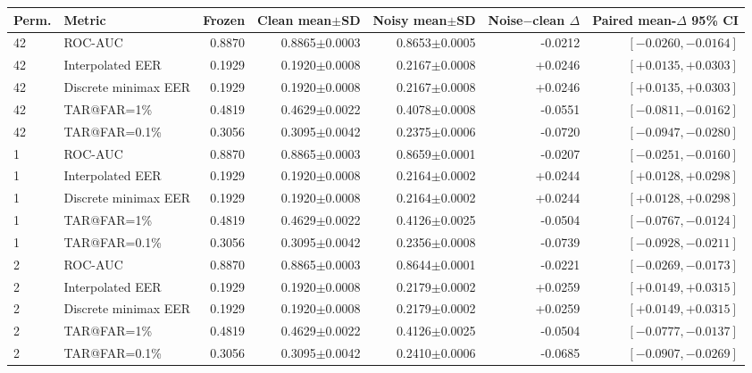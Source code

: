 \setlength{\tabcolsep}{3.5pt}
\footnotesize
\begin{tabular}{@{}llrrrrr@{}}
\toprule
Perm. & Metric & Frozen & Clean mean$\pm$SD & Noisy mean$\pm$SD & Noise$-$clean $\Delta$ & Paired mean-$\Delta$ 95\% CI \\
\midrule
42 & ROC-AUC & 0.8870 & 0.8865$\pm$0.0003 & 0.8653$\pm$0.0005 & -0.0212 & $[-0.0260,-0.0164]$ \\
42 & Interpolated EER & 0.1929 & 0.1920$\pm$0.0008 & 0.2167$\pm$0.0008 & +0.0246 & $[+0.0135,+0.0303]$ \\
42 & Discrete minimax EER & 0.1929 & 0.1920$\pm$0.0008 & 0.2167$\pm$0.0008 & +0.0246 & $[+0.0135,+0.0303]$ \\
42 & TAR@FAR=1\% & 0.4819 & 0.4629$\pm$0.0022 & 0.4078$\pm$0.0008 & -0.0551 & $[-0.0811,-0.0162]$ \\
42 & TAR@FAR=0.1\% & 0.3056 & 0.3095$\pm$0.0042 & 0.2375$\pm$0.0006 & -0.0720 & $[-0.0947,-0.0280]$ \\
1 & ROC-AUC & 0.8870 & 0.8865$\pm$0.0003 & 0.8659$\pm$0.0001 & -0.0207 & $[-0.0251,-0.0160]$ \\
1 & Interpolated EER & 0.1929 & 0.1920$\pm$0.0008 & 0.2164$\pm$0.0002 & +0.0244 & $[+0.0128,+0.0298]$ \\
1 & Discrete minimax EER & 0.1929 & 0.1920$\pm$0.0008 & 0.2164$\pm$0.0002 & +0.0244 & $[+0.0128,+0.0298]$ \\
1 & TAR@FAR=1\% & 0.4819 & 0.4629$\pm$0.0022 & 0.4126$\pm$0.0025 & -0.0504 & $[-0.0767,-0.0124]$ \\
1 & TAR@FAR=0.1\% & 0.3056 & 0.3095$\pm$0.0042 & 0.2356$\pm$0.0008 & -0.0739 & $[-0.0928,-0.0211]$ \\
2 & ROC-AUC & 0.8870 & 0.8865$\pm$0.0003 & 0.8644$\pm$0.0001 & -0.0221 & $[-0.0269,-0.0173]$ \\
2 & Interpolated EER & 0.1929 & 0.1920$\pm$0.0008 & 0.2179$\pm$0.0002 & +0.0259 & $[+0.0149,+0.0315]$ \\
2 & Discrete minimax EER & 0.1929 & 0.1920$\pm$0.0008 & 0.2179$\pm$0.0002 & +0.0259 & $[+0.0149,+0.0315]$ \\
2 & TAR@FAR=1\% & 0.4819 & 0.4629$\pm$0.0022 & 0.4126$\pm$0.0025 & -0.0504 & $[-0.0777,-0.0137]$ \\
2 & TAR@FAR=0.1\% & 0.3056 & 0.3095$\pm$0.0042 & 0.2410$\pm$0.0006 & -0.0685 & $[-0.0907,-0.0269]$ \\
\bottomrule
\end{tabular}
